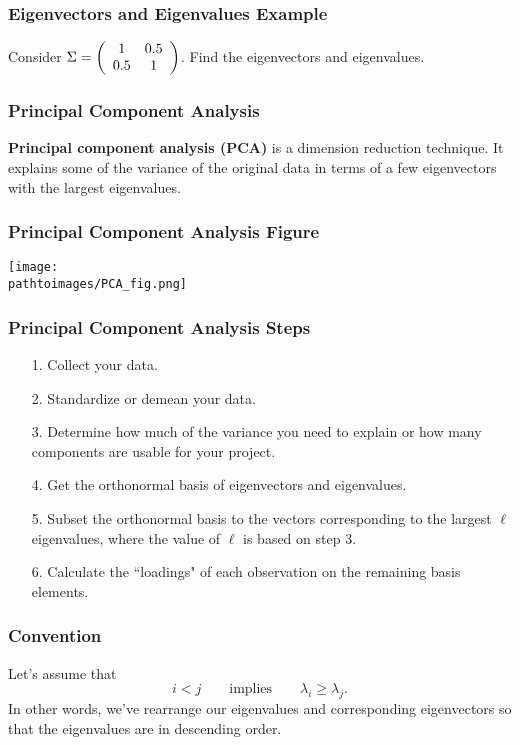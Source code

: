 \documentclass{beamer}
\newcommand{\pathtoimages}{/Users/charlesrambo/Desktop/Bootcamp24/Images}
\begin{document}
\begin{frame}[t]
\frametitle{Eigenvectors and Eigenvalues Example}
\begin{Example}
Consider $\Sigma = \left(\begin{array}{c c} 1	&	0.5\\ 0.5 & 1\end{array}\right)$. Find the eigenvectors and eigenvalues.
\end{Example}

\end{frame}

\begin{frame}
\frametitle{Principal Component Analysis}
{\bf Principal component analysis (PCA)} is a dimension reduction technique. It explains some of the variance of the original data in terms of a few eigenvectors with the largest eigenvalues. 

\end{frame}

\begin{frame}
\frametitle{Principal Component Analysis Figure}

\begin{center}
\texttt{[image: \\pathtoimages/PCA\_fig.png]}
\end{center}
\end{frame}

\begin{frame}
\frametitle{Principal Component Analysis Steps}

\begin{enumerate}
\item[1.] Collect your data.
\item[2.] Standardize or demean your data.
\item[3.] Determine how much of the variance you need to explain or how many components are usable for your project.
\item[4.] Get the orthonormal basis of eigenvectors and eigenvalues.
\item[5.] Subset the orthonormal basis to the vectors corresponding to the largest $\ell$ eigenvalues, where the value of $\ell$ is based on step 3.
\item[6.] Calculate the ``loadings" of each observation on the remaining basis elements.
\end{enumerate}
\end{frame}

\begin{frame}
\frametitle{Convention}
Let's assume that 
$$
i < j\qquad\text{implies}\qquad \lambda_i \geq \lambda_j.
$$ 
In other words, we've rearrange our eigenvalues and corresponding eigenvectors so that the eigenvalues are in descending order.
\end{frame}
\end{document}
